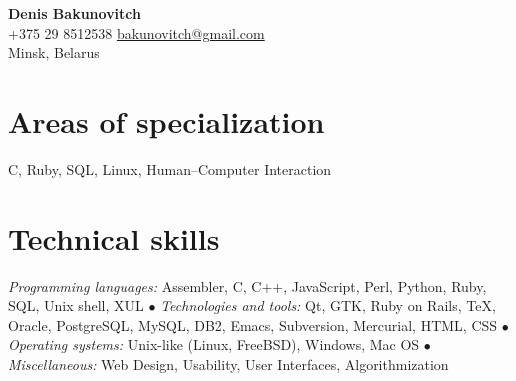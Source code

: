 \documentclass[12pt, a4paper]{article}
\begin{document}
\newlength{\rcollength}\setlength{\rcollength}{1.85in}%

\textbf{\Huge Denis Bakunovitch}\\
+375 29 8512538 \hfill \href{mailto:bakunovitch@gmail.com}{bakunovitch@gmail.com}\\
Minsk, Belarus\\
\quad\pagebreak[2]
\hrulefill

\section*{Areas of specialization}
C, Ruby, SQL, Linux, Human--Computer Interaction

\section*{Technical skills}
\textit{Programming languages:} Assembler, C, C++, JavaScript, Perl, Python, Ruby, SQL, Unix
shell, XUL $\bullet$
\textit{Technologies and tools:} Qt, GTK, Ruby on Rails, \TeX, Oracle, PostgreSQL,
MySQL, DB2, Emacs, Subversion, Mercurial, HTML, CSS $\bullet$
\textit{Operating systems:} Unix-like (Linux, FreeBSD), Windows, Mac
OS $\bullet$
\textit{Miscellaneous:} Web Design, Usability, User Interfaces,
Algorithmization
\end{document}
